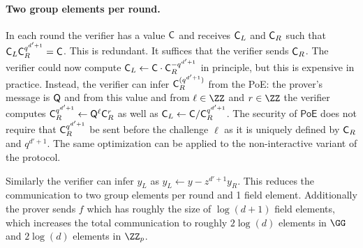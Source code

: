 
\paragraph{Two group elements per round.} In each round the verifier has a value $\mathsf{C}$ and receives $\mathsf{C}_L$ and $\mathsf{C}_R$ such that $\mathsf{C}_L\mathsf{C}_R^{q^{d'+1}}=\mathsf{C}$. This is redundant. It suffices that the verifier sends $\mathsf{C}_R$. The verifier could now compute $\mathsf{C}_L\gets \mathsf{C} \cdot \mathsf{C}_R^{-q^{d'+1}}$ in principle, but this is expensive in practice. Instead, the verifier can infer $\mathsf{C}_R^{(q^{d'+1})}$ from the \textsf{PoE}: the prover's message is $\mathsf{Q}$ and from this value and from $\ell \in \ZZ$ and $r \in \ZZ$ the verifier computes $\mathsf{C}_R^{q^{d'+1}}\gets \mathsf{Q}^{\ell} \mathsf{C}_R^{r}$ as well as $\mathsf{C}_L \gets \mathsf{C}/\mathsf{C}_R^{q^{d'+1}}$. The security of $\textsf{PoE}$ does not require that $\mathsf{C}_R^{q^{d'+1}}$ be sent before the challenge $\ell$ as it is uniquely defined by $\mathsf{C}_R$ and $q^{d'+1}$.
The same optimization can be applied to the non-interactive variant of the protocol. 

Similarly the verifier can infer $y_L$ as $y_L\gets y-z^{d'+1} y_R$. This reduces the communication to two group elements per round and 1 field element. Additionally the prover sends $f$ which has roughly the size of $\log(d+1)$ field elements, which increases the total communication to roughly $2\log(d)$ elements in $\GG$ and $2\log(d)$ elements in $\ZZ_p$. 

